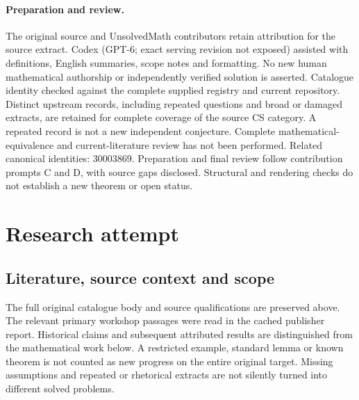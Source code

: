 \documentclass[11pt]{article}
\begin{document}
\paragraph{Preparation and review.}
The original source and UnsolvedMath contributors retain attribution for the source extract. Codex (GPT-6; exact serving revision not exposed) assisted with definitions, English summaries, scope notes and formatting. No new human mathematical authorship or independently verified solution is asserted. Catalogue identity checked against the complete supplied registry and current repository. Distinct upstream records, including repeated questions and broad or damaged extracts, are retained for complete coverage of the source CS category. A repeated record is not a new independent conjecture. Complete mathematical-equivalence and current-literature review has not been performed. Related canonical identities: 30003869. Preparation and final review follow contribution prompts C and D, with source gaps disclosed. Structural and rendering checks do not establish a new theorem or open status.
\label{end:statement}

\section{Research attempt}
\subsection{Literature, source context and scope}
The full original catalogue body and source qualifications are preserved above. The relevant primary workshop passages were read in the cached publisher report. Historical claims and subsequent attributed results are distinguished from the mathematical work below. A restricted example, standard lemma or known theorem is not counted as new progress on the entire original target. Missing assumptions and repeated or rhetorical extracts are not silently turned into different solved problems.
\end{document}
